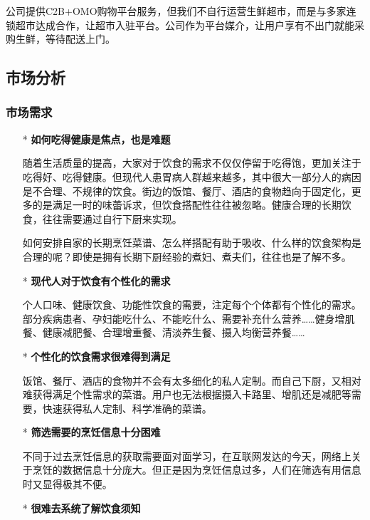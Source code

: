 \documentclass[UTF8,12pt]{ctexart}
\numberwithin{figure}{section}%
\begin{document}
\begin{spacing}{2}
公司提供C2B+OMO购物平台服务，但我们不自行运营生鲜超市，而是与多家连锁超市达成合作，让超市入驻平台。公司作为平台媒介，让用户享有不出门就能采购生鲜，等待配送上门。

\subsection{市场分析}
\subsubsection{市场需求}
	\begin{itemize}
		
		\item[*] \textbf{如何吃得健康是焦点，也是难题}
		
		\setlength{\parindent}{2em}随着生活质量的提高，大家对于饮食的需求不仅仅停留于吃得饱，更加关注于吃得好、吃得健康。但现代人患胃病人群越来越多，其中很大一部分人的病因是不合理、不规律的饮食。街边的饭馆、餐厅、酒店的食物趋向于固定化，更多的是满足一时的味蕾诉求，但饮食搭配性往往被忽略。健康合理的长期饮食，往往需要通过自行下厨来实现。
		
		如何安排自家的长期烹饪菜谱、怎么样搭配有助于吸收、什么样的饮食架构是合理的呢？即使是拥有长期下厨经验的煮妇、煮夫们，往往也是了解不多。		
		
		\item[*] \textbf{现代人对于饮食有个性化的需求}
		
		\setlength{\parindent}{2em}个人口味、健康饮食、功能性饮食的需要，注定每个个体都有个性化的需求。部分疾病患者、孕妇能吃什么、不能吃什么、需要补充什么营养……健身增肌餐、健康减肥餐、合理增重餐、清淡养生餐、摄入均衡营养餐……
		
		\item[*] \textbf{个性化的饮食需求很难得到满足}

		\setlength{\parindent}{2em}饭馆、餐厅、酒店的食物并不会有太多细化的私人定制。而自己下厨，又相对难获得满足个性需求的菜谱。用户也无法根据摄入卡路里、增肌还是减肥等需要，快速获得私人定制、科学准确的菜谱。
		
		\item[*] \textbf{筛选需要的烹饪信息十分困难}

		\setlength{\parindent}{2em}不同于过去烹饪信息的获取需要面对面学习，在互联网发达的今天，网络上关于烹饪的数据信息十分庞大。但正是因为烹饪信息过多，人们在筛选有用信息时又显得极其不便。
				
		\item[*] \textbf{很难去系统了解饮食须知}
		

\end{itemize}
\end{spacing}
\end{document}
